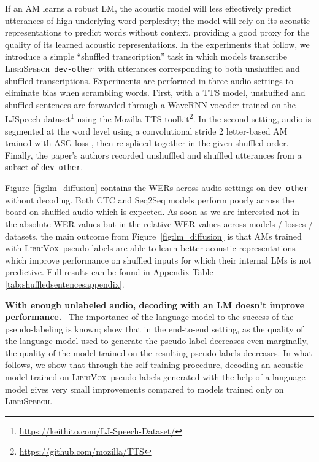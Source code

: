 \documentclass{article}
\def\devother{\texttt{dev-other}}
\newcommand{\librivox}{\textsc{LibriVox}}
\newcommand{\librispeech}{\textsc{LibriSpeech}}
\begin{document}
If an AM learns a robust LM, the acoustic model will less effectively predict utterances of high underlying word-perplexity; the model will rely on its acoustic representations to predict words without context, providing a good proxy for the quality of its learned acoustic representations. In the experiments that follow, we introduce a simple ``shuffled transcription'' task in which models transcribe \librispeech~\devother~with utterances corresponding to both unshuffled and shuffled transcriptions. Experiments are performed in three audio settings to eliminate bias when scrambling words. First, with a TTS model, unshuffled and shuffled sentences are forwarded through a WaveRNN vocoder \cite{kalchbrenner2018efficient} trained on the LJSpeech dataset\footnote{\url{https://keithito.com/LJ-Speech-Dataset/}} using the Mozilla TTS toolkit\footnote{\url{https://github.com/mozilla/TTS}}. In the second setting, audio is segmented at the word level using a convolutional stride 2 letter-based AM trained with ASG loss \cite{collobert2016wav2letter}, then re-spliced together in the given shuffled order. Finally, the paper's authors recorded unshuffled and shuffled utterances from a subset of \devother.

Figure~\ref{fig:lm_diffusion} contains the WERs across audio settings on \devother~ without decoding. Both CTC and Seq2Seq models perform poorly across the board on shuffled audio which is expected. As soon as we are interested not in the absolute WER values but in the relative WER values across models / losses / datasets, the main outcome from Figure~\ref{fig:lm_diffusion} is that AMs trained with \librivox~pseudo-labels are able to learn better acoustic representations which improve performance on shuffled inputs for which their internal LMs is not predictive. Full results can be found in Appendix Table \ref{tab:shuffledsentencesappendix}.

\textbf{With enough unlabeled audio, decoding with an LM doesn't improve performance.}~
\label{sec:lmnolm}
The importance of the language model to the success of the pseudo-labeling is known; \cite{kahn2019self} show that in the end-to-end setting, as the quality of the language model used to generate the pseudo-label decreases even marginally, the quality of the model trained on the resulting pseudo-labels decreases. In what follows, we show that through the self-training procedure, decoding an acoustic model trained on \librivox~pseudo-labels generated with the help of a language model gives very small improvements compared to models trained only on \librispeech.
\end{document}
